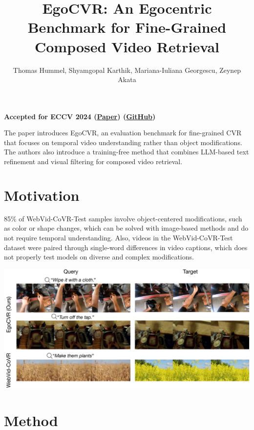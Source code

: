 \documentclass{article}
\title{EgoCVR: An Egocentric Benchmark for Fine-Grained Composed Video Retrieval}
\author{Thomas Hummel, Shyamgopal Karthik, Mariana-Iuliana Georgescu, Zeynep Akata}
\date{}
\begin{document}
\maketitle

\begin{center}\textbf{Accepted for ECCV 2024 (\href{https://arxiv.org/pdf/2407.16658}{Paper}) (\href{https://github.com/ExplainableML/EgoCVR}{GitHub})}\end{center}

The paper introduces EgoCVR, an evaluation benchmark for fine-grained CVR that focuses on temporal video understanding rather than object modifications. The authors also introduce a training-free method that combines LLM-based text refinement and visual filtering for composed video retrieval.

\section*{Motivation}

85\% of WebVid-CoVR-Test samples involve object-centered modifications, such as color or shape changes, which can be solved with image-based methods and do not require temporal understanding. Also, videos in the WebVid-CoVR-Test dataset were paired through single-word differences in video captions, which does not properly test models on diverse and complex modifications.

\begin{center}
    \includegraphics[scale=0.22]{egocvr-1.png}
\end{center}

\section*{Method}
\end{document}
